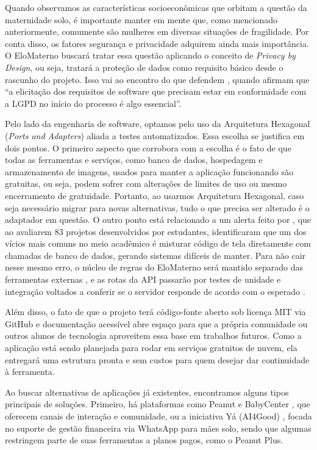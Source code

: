 Quando observamos as características socioeconômicas que orbitam a questão da maternidade solo, é importante manter em mente que, como mencionado anteriormente, comumente são mulheres em diversas situações de fragilidade. Por conta disso, os fatores segurança e privacidade adquirem ainda mais importância. O EloMaterno buscará tratar essa questão aplicando o conceito de \textit{Privacy by Design}, ou seja, tratará a proteção de dados como requisito básico desde o rascunho do projeto. Isso vai ao encontro do que defendem \textcite[3]{moura2024}, quando afirmam que ``a elicitação dos requisitos de software que precisam estar em conformidade com a LGPD no início do processo é algo essencial''.

Pelo lado da engenharia de software, optamos pelo uso da Arquitetura Hexagonal (\textit{Ports and Adapters}) aliada a testes automatizados. Essa escolha se justifica em dois pontos. O primeiro aspecto que corrobora com a escolha é o fato de que todas as ferramentas e serviços, como banco de dados, hospedagem e armazenamento de imagens, usados para manter a aplicação funcionando são gratuitas, ou seja, podem sofrer com alterações de limites de uso ou mesmo encerramento de gratuidade. Portanto, ao usarmos Arquitetura Hexagonal, caso seja necessário migrar para novas alternativas, tudo o que precisa ser alterado é o adaptador em questão. O outro ponto está relacionado a um alerta feito por \textcite{deluca2025}, que ao avaliarem 83 projetos desenvolvidos por estudantes, identificaram que um dos vícios mais comuns no meio acadêmico é misturar código de tela diretamente com chamadas de banco de dados, gerando sistemas difíceis de manter. Para não cair nesse mesmo erro, o núcleo de regras do EloMaterno será mantido separado das ferramentas externas \cite{rayarao2026}, e as rotas da API passarão por testes de unidade e integração voltados a conferir se o servidor responde de acordo com o esperado \cite{banias2021}.

Além disso, o fato de que o projeto terá código-fonte aberto sob licença MIT via GitHub e documentação acessível abre espaço para que a própria comunidade ou outros alunos de tecnologia aproveitem essa base em trabalhos futuros. Como a aplicação está sendo planejada para rodar em serviços gratuitos de nuvem, ela entregará uma estrutura pronta e sem custos para quem desejar dar continuidade à ferramenta.

Ao buscar alternativas de aplicações já existentes, encontramos alguns tipos principais de soluções. Primeiro, há plataformas como Peanut \cite{peanut2026} e BabyCenter \cite{babycenter2026}, que oferecem canais de interação e comunidade, ou a iniciativa Yá (AI4Good) \cite{ya2026}, focada no suporte de gestão financeira via WhatsApp para mães solo, sendo que algumas restringem parte de suas ferramentas a planos pagos, como o Peanut Plus.

